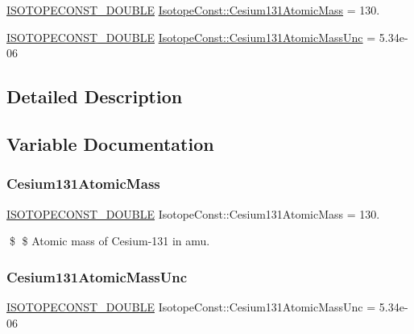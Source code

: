 \begin{DoxyCompactItemize}
\item 
\mbox{\hyperlink{group___isotope_const-_macros_ga8f45a7272ce02c0b4c65c44636ed719a}{I\+S\+O\+T\+O\+P\+E\+C\+O\+N\+S\+T\+\_\+\+D\+O\+U\+B\+LE}} \mbox{\hyperlink{group___isotope_const-_cesium-_cs131_ga323b9dd551579dc8a33814862a66362c}{Isotope\+Const\+::\+Cesium131\+Atomic\+Mass}} = 130.
\item 
\mbox{\hyperlink{group___isotope_const-_macros_ga8f45a7272ce02c0b4c65c44636ed719a}{I\+S\+O\+T\+O\+P\+E\+C\+O\+N\+S\+T\+\_\+\+D\+O\+U\+B\+LE}} \mbox{\hyperlink{group___isotope_const-_cesium-_cs131_ga4ce6939c036547364cfe7614da17c76a}{Isotope\+Const\+::\+Cesium131\+Atomic\+Mass\+Unc}} = 5.\+34e-\/06
\end{DoxyCompactItemize}


\subsection{Detailed Description}


\subsection{Variable Documentation}
\mbox{\label{group___isotope_const-_cesium-_cs131_ga323b9dd551579dc8a33814862a66362c}} 
\subsubsection{\texorpdfstring{Cesium131\+Atomic\+Mass}{Cesium131AtomicMass}}
{\footnotesize\ttfamily \mbox{\hyperlink{group___isotope_const-_macros_ga8f45a7272ce02c0b4c65c44636ed719a}{I\+S\+O\+T\+O\+P\+E\+C\+O\+N\+S\+T\+\_\+\+D\+O\+U\+B\+LE}} Isotope\+Const\+::\+Cesium131\+Atomic\+Mass = 130.}

\$ \$ Atomic mass of Cesium-\/131 in amu. \mbox{\label{group___isotope_const-_cesium-_cs131_ga4ce6939c036547364cfe7614da17c76a}} 
\subsubsection{\texorpdfstring{Cesium131\+Atomic\+Mass\+Unc}{Cesium131AtomicMassUnc}}
{\footnotesize\ttfamily \mbox{\hyperlink{group___isotope_const-_macros_ga8f45a7272ce02c0b4c65c44636ed719a}{I\+S\+O\+T\+O\+P\+E\+C\+O\+N\+S\+T\+\_\+\+D\+O\+U\+B\+LE}} Isotope\+Const\+::\+Cesium131\+Atomic\+Mass\+Unc = 5.\+34e-\/06}

